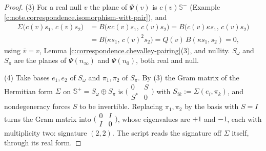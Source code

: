 \documentclass[11pt]{article}
\theoremstyle{definition}
\theoremstyle{plain}
\providecommand{\CS}{}\renewcommand{\CS}{{\mathbb{S}^{+}}}
\providecommand{\CSm}{}\renewcommand{\CSm}{{\mathbb{S}^{-}}}
\providecommand{\Som}{}\renewcommand{\Som}{S_\omega}
\providecommand{\Spi}{}\renewcommand{\Spi}{S_\pi}
\providecommand{\nInf}{}\renewcommand{\nInf}{n_\infty}
\providecommand{\nO}{}\renewcommand{\nO}{n_0}
\begin{document}
\begin{proof}
(3) For a real null $v$ the plane of $\Psi(v)$ is $c(v)\CSm$ (Example \ref{c:note.correspondence.isomorphism-witt-pair}), and
\begin{align*}
\Sigma\bigl(c(v)s_1,\, c(v)s_2\bigr) &= B\bigl(\kappa c(v)s_1,\, c(v)s_2\bigr) = B\bigl(c(v)\kappa s_1,\, c(v)s_2\bigr)\\
&= B\bigl(\kappa s_1,\, c(v)^2 s_2\bigr) = Q(v)\,B(\kappa s_1, s_2) = 0 ,
\end{align*}
using $\bar v = v$, Lemma \ref{c:correspondence.chevalley-pairing}(3), and nullity. $\Som$ and $\Spi$ are the planes of $\Psi(\nInf)$ and $\Psi(\nO)$, both real and null.

(4) Take bases $e_1, e_2$ of $\Som$ and $\pi_1, \pi_2$ of $\Spi$. By (3) the Gram matrix of the Hermitian form $\Sigma$ on $\CS = \Som\oplus\Spi$ is $\bigl(\begin{smallmatrix} 0 & S \\ S^* & 0\end{smallmatrix}\bigr)$ with $S_{ik} := \Sigma(e_i, \pi_k)$, and nondegeneracy forces $S$ to be invertible. Replacing $\pi_1, \pi_2$ by the basis with $S = I$ turns the Gram matrix into $\bigl(\begin{smallmatrix} 0 & I \\ I & 0\end{smallmatrix}\bigr)$, whose eigenvalues are $+1$ and $-1$, each with multiplicity two: signature $(2,2)$. The script reads the signature off $\Sigma$ itself, through its real form.


\end{proof}
\end{document}
